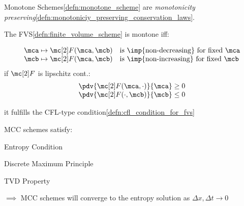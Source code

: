 \begin{corbox}\nospacing
    \begin{cor}\label{cor:monotone_schemes_and_monotonicity}
        Monotone Schemes\cref{defn:monotone_scheme} are \textit{monotonicity preserving}\cref{defn:monotoniciy_preserving_conservation_laws}.
    \end{cor}
\end{corbox}
\begin{corbox}\nospacing
    \begin{cor}\label{cor:monotone_fvm}
        The FVS\cref{defn:finite_volume_scheme} is montone iff:
        \begin{circlelistnosep}
            \item
        \begin{align}
          &\mca\mapsto\Flux(\mca,\mcb)&&\text{is \imp{non-decreasing} for fixed }\mca \\[-1\jot]
          &\mcb\mapsto\Flux(\mca,\mcb)&&\text{is \imp{non-increasing} for fixed }\mcb
        \end{align}
        if $\Flux$ is lipschitz cont.:
        \begin{align}
          &\pdv{\Flux(\mca,\cdot)}{\mca}\geq0\label{eq:monotone_fvm_lipschitz_inc}\\[-1\jot]
          &\pdv{\Flux(\cdot,\mcb)}{\mcb}\leq0\label{eq:monotone_fvm_lipschitz_dec}
        \end{align}
        \item it fulfills the CFL-type condition\cref{defn:cfl_condition_for_fvs}
        \end{circlelistnosep}
    \end{cor}
\end{corbox}
\begin{corbox}\nospacing
    \begin{cor}\label{cor:monotone_consistent_convervative_schemes}
        MCC schemes satisfy:
        \begin{circlelistnosep}
            \item Entropy Condition
            \item Discrete Maximum Principle
            \item TVD Property
        \end{circlelistnosep}
        $\implies$ MCC schemes will converge to the entropy solution as $\Delta x,\Delta t\to0$
    \end{cor}
\end{corbox}
